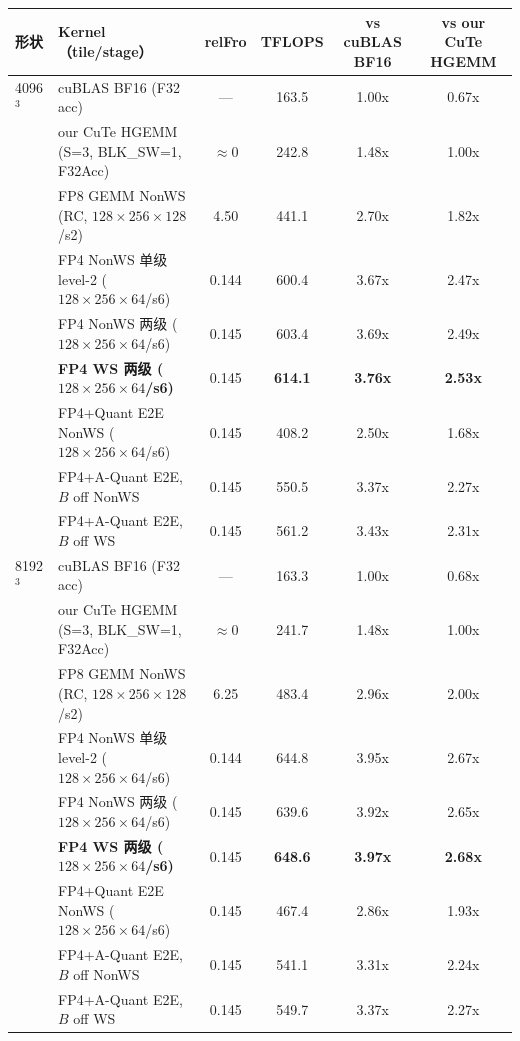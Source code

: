 \begin{center}
\scriptsize
\begin{tabular}{llcccc}
\toprule
形状 & Kernel（tile/stage） & relFro & TFLOPS & vs cuBLAS BF16 & vs our CuTe HGEMM \\
\midrule
4096$^3$ & cuBLAS BF16 (F32 acc)              & ---   & 163.5 & 1.00x & 0.67x \\
         & our CuTe HGEMM (S=3, BLK\_SW=1, F32Acc) & $\approx$0 & 242.8 & 1.48x & 1.00x \\
         & FP8 GEMM NonWS (RC, $128{\times}256{\times}128$/s2) & 4.50 & 441.1 & 2.70x & 1.82x \\
         & FP4 NonWS 单级 level-2 ($128{\times}256{\times}64$/s6) & 0.144 & 600.4 & 3.67x & 2.47x \\
         & FP4 NonWS 两级 ($128{\times}256{\times}64$/s6) & 0.145 & 603.4 & 3.69x & 2.49x \\
         & \textbf{FP4 WS 两级 ($128{\times}256{\times}64$/s6)} & 0.145 & \textbf{614.1} & \textbf{3.76x} & \textbf{2.53x} \\
         & FP4+Quant E2E NonWS ($128{\times}256{\times}64$/s6) & 0.145 & 408.2 & 2.50x & 1.68x \\
         & FP4+A-Quant E2E, $B$ off NonWS & 0.145 & 550.5 & 3.37x & 2.27x \\
         & FP4+A-Quant E2E, $B$ off WS    & 0.145 & 561.2 & 3.43x & 2.31x \\
\midrule
8192$^3$ & cuBLAS BF16 (F32 acc)              & ---   & 163.3 & 1.00x & 0.68x \\
         & our CuTe HGEMM (S=3, BLK\_SW=1, F32Acc) & $\approx$0 & 241.7 & 1.48x & 1.00x \\
         & FP8 GEMM NonWS (RC, $128{\times}256{\times}128$/s2) & 6.25 & 483.4 & 2.96x & 2.00x \\
         & FP4 NonWS 单级 level-2 ($128{\times}256{\times}64$/s6) & 0.144 & 644.8 & 3.95x & 2.67x \\
         & FP4 NonWS 两级 ($128{\times}256{\times}64$/s6) & 0.145 & 639.6 & 3.92x & 2.65x \\
         & \textbf{FP4 WS 两级 ($128{\times}256{\times}64$/s6)} & 0.145 & \textbf{648.6} & \textbf{3.97x} & \textbf{2.68x} \\
         & FP4+Quant E2E NonWS ($128{\times}256{\times}64$/s6) & 0.145 & 467.4 & 2.86x & 1.93x \\
         & FP4+A-Quant E2E, $B$ off NonWS & 0.145 & 541.1 & 3.31x & 2.24x \\
         & FP4+A-Quant E2E, $B$ off WS    & 0.145 & 549.7 & 3.37x & 2.27x \\
\bottomrule
\end{tabular}
\end{center}

